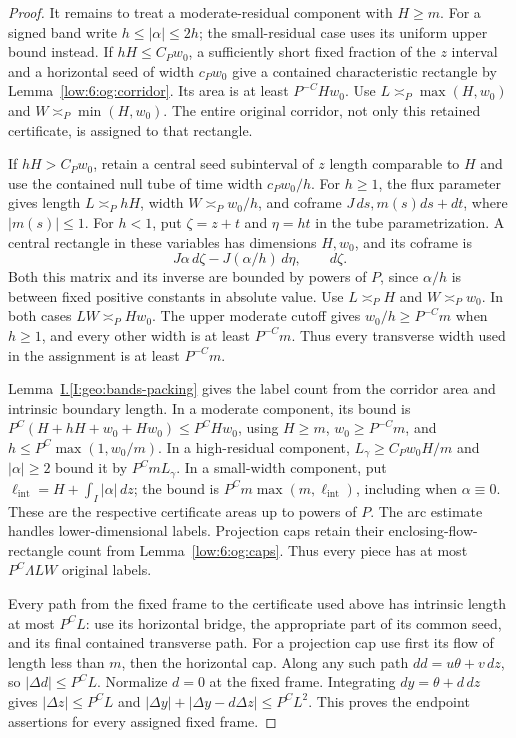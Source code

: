 \documentclass[11pt]{amsart}
\theoremstyle{definition}
\theoremstyle{remark}
\numberwithin{equation}{section}
\newcommand{\partIref}[1]{\hyperref[I:#1]{I.\ref*{I:#1}}}
\begin{document}
\begin{proof}
It remains to treat a moderate-residual component with $H\ge m$. For a signed band write $h\le|\alpha|\le2h$; the small-residual case uses its uniform upper bound instead. If $hH\le C_Pw_0$, a sufficiently short fixed fraction of the $z$ interval and a horizontal seed of width $c_Pw_0$ give a contained characteristic rectangle by Lemma~\ref{low:6:og:corridor}. Its area is at least $P^{-C}Hw_0$. Use $L\asymp_P\max(H,w_0)$ and $W\asymp_P\min(H,w_0)$. The entire original corridor, not only this retained certificate, is assigned to that rectangle.

If $hH>C_Pw_0$, retain a central seed subinterval of $z$ length comparable to $H$ and use the contained null tube of time width $c_Pw_0/h$. For $h\ge1$, the flux parameter gives length $L\asymp_PhH$, width $W\asymp_Pw_0/h$, and coframe $J\,ds,m(s)ds+dt$, where $|m(s)|\le1$. For $h<1$, put $\zeta=z+t$ and $\eta=ht$ in the tube parametrization. A central rectangle in these variables has dimensions $H,w_0$, and its coframe is
\[
J\alpha\,d\zeta-J(\alpha/h)\,d\eta,\qquad d\zeta.
\]
Both this matrix and its inverse are bounded by powers of $P$, since $\alpha/h$ is between fixed positive constants in absolute value. Use $L\asymp_PH$ and $W\asymp_Pw_0$. In both cases $LW\asymp_PHw_0$. The upper moderate cutoff gives $w_0/h\ge P^{-C}m$ when $h\ge1$, and every other width is at least $P^{-C}m$. Thus every transverse width used in the assignment is at least $P^{-C}m$.

Lemma~\partIref{geo:bands-packing} gives the label count from the corridor area and intrinsic boundary length. In a moderate component, its bound is \(P^C(H+hH+w_0+Hw_0)\le P^CHw_0\), using \(H\ge m\), \(w_0\ge P^{-C}m\), and \(h\le P^C\max(1,w_0/m)\). In a high-residual component, \(L_\gamma\ge C_Pw_0H/m\) and \(|\alpha|\ge2\) bound it by \(P^CmL_\gamma\). In a small-width component, put \(\ell_{\mathrm{int}}=H+\int_I|\alpha|\,dz\); the bound is \(P^Cm\max(m,\ell_{\mathrm{int}})\), including when \(\alpha\equiv0\). These are the respective certificate areas up to powers of \(P\). The arc estimate handles lower-dimensional labels. Projection caps retain their enclosing-flow-rectangle count from Lemma~\ref{low:6:og:caps}. Thus every piece has at most \(P^C\Lambda LW\) original labels.

Every path from the fixed frame to the certificate used above has intrinsic length at most $P^CL$: use its horizontal bridge, the appropriate part of its common seed, and its final contained transverse path. For a projection cap use first its flow of length less than $m$, then the horizontal cap. Along any such path $dd=u\theta+v\,dz$, so $|\Delta d|\le P^CL$. Normalize $d=0$ at the fixed frame. Integrating $dy=\theta+d\,dz$ gives $|\Delta z|\le P^CL$ and $|\Delta y|+|\Delta y-d\Delta z|\le P^CL^2$. This proves the endpoint assertions for every assigned fixed frame.


\end{proof}
\end{document}
